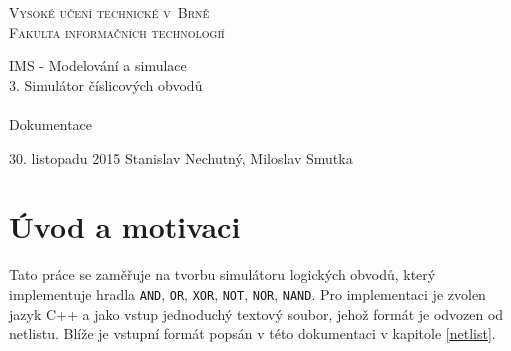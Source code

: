 \documentclass[11pt,a4paper]{article}
\author{Stanislav Nechutný}
\begin{document}



\newcommand{\slideRef}[1]{\textit{(IMS slide #1)}}
\newcommand{\code}[1]{\texttt{#1}}

	\begin{titlepage}

		\begin{center}

			\textsc{
				\Huge
					Vysoké učení technické v~Brně\\
				\huge
					Fakulta informačních technologií
			}\\


			\LARGE
					IMS - Modelování a simulace\\
					3. Simulátor číslicových obvodů\\~\\
			\Huge{}
					Dokumentace

		\end{center}

		{\Large
			30. listopadu 2015
			\hfill
			Stanislav Nechutný, Miloslav Smutka
		}

	\end{titlepage}

	\tableofcontents

	\pagebreak


	\section{Úvod a motivaci}
		Tato práce se zaměřuje na tvorbu simulátoru logických obvodů, který implementuje hradla \code{AND}, \code{OR}, \code{XOR}, \code{NOT}, \code{NOR}, \code{NAND}. Pro implementaci je zvolen jazyk C++ a jako vstup jednoduchý textový soubor, jehož formát je odvozen od netlistu. Blíže je vstupní formát popsán v této dokumentaci v kapitole \ref{netlist}.
\end{document}
